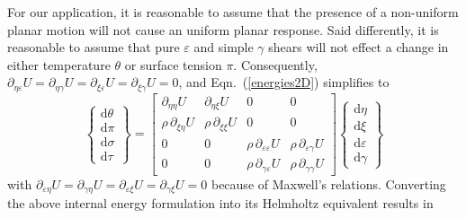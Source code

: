 For our application, it is reasonable to assume that the presence of a non-uniform planar motion will not cause an uniform planar response.  Said differently, it is reasonable to assume that pure $\varepsilon$ and simple $\gamma$ shears will not effect a change in either temperature $\theta$ or surface tension $\pi$.  Consequently, $\partial_{\eta\varepsilon} U = \partial_{\eta\gamma} U = \partial_{\xi\varepsilon} U = \partial_{\xi\gamma} U = 0$, and Eqn.~(\ref{energies2D}) simplifies to
\begin{displaymath}
\left\{ \begin{matrix}
\mathrm{d} \theta \\ \mathrm{d} \pi \\
\mathrm{d} \sigma \\ \mathrm{d} \tau
\end{matrix} \right\} = \begin{bmatrix}
\partial_{\eta\eta} U & 
\partial_{\eta\xi} U & 
0 & 0 \\ 
\rho \, \partial_{\xi\eta} U & 
\rho \, \partial_{\xi\xi} U & 
0 & 0 \\
0 & 0 & 
\rho \, \partial_{\varepsilon\varepsilon} U & 
\rho \, \partial_{\varepsilon\gamma} U \\
0 & 0 & 
\rho \, \partial_{\gamma\varepsilon} U & 
\rho \, \partial_{\gamma\gamma} U 
\end{bmatrix} 
\left\{ \begin{matrix}
\mathrm{d}\eta \\ \mathrm{d} \xi \\
\mathrm{d} \varepsilon \\ \mathrm{d} \gamma
\end{matrix} \right\} 
\end{displaymath}
with $\partial_{\varepsilon\eta} U = \partial_{\gamma\eta} U = \partial_{\varepsilon\xi} U = \partial_{\gamma\xi} U = 0$ because of Maxwell's relations.  Converting the above internal energy formulation into its Helmholtz equivalent results in

